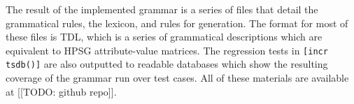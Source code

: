 
The result of the implemented grammar is a series of files that detail the grammatical rules, the lexicon, and rules for generation. The format for most of these files is TDL, which is a series of grammatical descriptions which are equivalent to HPSG attribute-value matrices. The regression tests in \texttt{[incr tsdb()]} \citep{oepen2001} are also outputted to readable databases which show the resulting coverage of the grammar run over test cases. All of these materials are available at [[TODO: github repo]].


